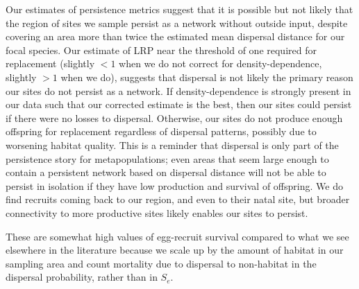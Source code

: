 \documentclass[12pt, oneside]{article}   	%
\begin{document}


Our estimates of persistence metrics suggest that it is possible but not likely that the region of sites we sample persist as a network without outside input, despite covering an area more than twice the estimated mean dispersal distance for our focal species. Our estimate of LRP near the threshold of one required for replacement (slightly $ < 1$ when we do not correct for density-dependence, slightly $ > 1$ when we do), suggests that dispersal is not likely the primary reason our sites do not persist as a network. If density-dependence is strongly present in our data such that our corrected estimate is the best, then our sites could persist if there were no losses to dispersal. Otherwise, our sites do not produce enough offspring for replacement regardless of dispersal patterns, possibly due to worsening habitat quality. This is a reminder that dispersal is only part of the persistence story for metapopulations; even areas that seem large enough to contain a persistent network based on dispersal distance will not be able to persist in isolation if they have low production and survival of offspring. We do find recruits coming back to our region, and even to their natal site, but broader connectivity to more productive sites likely enables our sites to persist.

These are somewhat high values of egg-recruit survival compared to what we see elsewhere in the literature \citep[e.g.][]{rumrill_natural_1990, metaxas_quantifying_2009} \citep[though not unreasonable, e.g.][]{white2014planktonic, johnson2018integrating} because we scale up by the amount of habitat in our sampling area and count mortality due to dispersal to non-habitat in the dispersal probability, rather than in $S_e$. 
\end{document}
